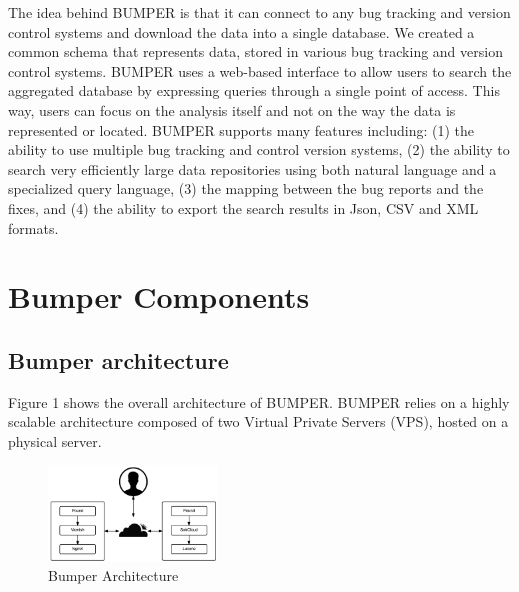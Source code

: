 \documentclass[conference]{IEEEtran}
\begin{document}
The idea behind BUMPER is that it can connect to any bug tracking and
version control systems and download the data into a single database.
 We created a common schema that represents data, stored in various
 bug tracking and version control systems.
 BUMPER uses a web-based interface to allow users to search the
 aggregated database by expressing queries through a single point of access.
 This way, users can focus on the analysis itself and not on the way the data
 is represented or located.
 BUMPER supports many features including: (1) the ability to use multiple bug
 tracking and control version systems, (2) the ability to search very
  efficiently large data repositories using both natural language and a
  specialized query language, (3) the mapping between the bug reports and
  the fixes, and (4) the ability to export the search results in Json,
  CSV and XML formats.

\section{Bumper Components}
\label{sec:Bumper Components}

\subsection{Bumper architecture}
\label{sub:Bumper architecture}

Figure 1 shows the overall architecture of BUMPER.
BUMPER relies on a highly scalable architecture composed of two
Virtual Private Servers (VPS), hosted on a physical server.

\begin{figure}
  \centering
  \includegraphics[width=0.4\textwidth]{media/archi.png}
  \caption{Bumper Architecture}
\vspace{-1.8em}
\end{figure}
\end{document}
